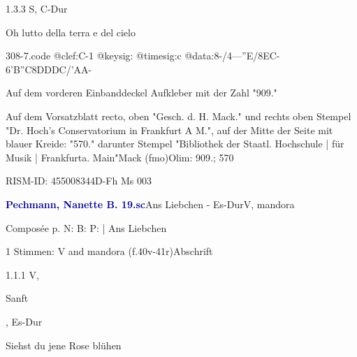 \documentclass[twocolumn, 12pt]{book}
\begin{document}
\newline %
\par 1.3.3  S, C-Dur\newline \begin{footnotesize} Oh lutto della terra e del cielo \end{footnotesize}  
\begin{filecontents*}{308-7.code}
@clef:C-1
@keysig:
@timesig:c
@data:8-/4---''E/8EC-6'B''C8DDDC/'AA-
\end{filecontents*}
\newline %
\par Auf dem vorderen Einbanddeckel Aufkleber mit der Zahl "909."
\par Auf dem Vorsatzblatt recto, oben "Gesch. d. H. Mack." und rechts oben Stempel "Dr. Hoch's Conservatorium in Frankfurt A M.", auf der Mitte der Seite mit blauer Kreide: "570." darunter Stempel "Bibliothek der Staatl. Hochschule | für Musik | Frankfurta. Main"\newline Mack  (fmo)\newline Olim: 909.; 570
\par RISM-ID: 455008344\newline D-Fh  Ms 003
\par \vspace{16pt} \textcolor{darkblue}{\textbf{Pechmann, Nanette B.  19.sc}}\hfillplus{\textbf{[309]}}\newline Ans Liebchen - Es-Dur\newline V, mandora
\par \begin{itshape}[heading, f.40v:] Composée p. N: B: P: | Ans Liebchen\end{itshape} 
\par \textcolor{darkblue}{}  1 Stimmen: V and mandora  (f.40v-41r)\newline Abschrift
\par 1.1.1  V, \begin{itshape}Sanft\end{itshape}, Es-Dur\newline \begin{footnotesize} Siehst du jene Rose blühen \end{footnotesize}  
\end{document}
